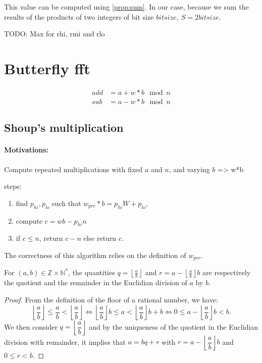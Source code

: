 \documentclass[a4paper]{article}
\begin{document}
This value can be computed using \ref{prop:sum}. In our case, because we sum the results of the products of two integers of bit size $bitsize,\ S = 2 bitsize$.

TODO: Max for rhi, rmi and rlo



\section{Butterfly fft}
\begin{align*}
    add &= a + w*b \mod n \\
    sub &= a - w*b \mod n 
\end{align*}

\subsection{Shoup's multiplication}


\paragraph{Motivations:} Compute repeated multiplications with fixed $a$ and $n$, and varying $b$ => w*b

steps:
\begin{enumerate}
    \item find $p_{hi}, p_{lo}$ such that $w_{pre} * b = p_{hi}W + p_{lo}$,
    \item compute $c = wb - p_{hi}n$
    \item if $c \leq n$, return $c-n$ else return $c$.
\end{enumerate}

The correctness of this algorithm relies on the definition of $w_{pre}$. 

\begin{proposition}\label{prop:quorem}
For $(a,b) \in \mathbb{Z}\times \mathbb{N}^*$, the quantities $q=\left\lfloor\frac{a}{b}\right\rfloor$ and $r=a - \left\lfloor\frac{a}{b}\right\rfloor b$ are respectively the quotient and the remainder in the Euclidian division of $a$ by $b$.
\end{proposition}
    
\begin{proof}
From the definition of the floor of a rational number, we have:
\[
    \left\lfloor\dfrac{a}{b}\right\rfloor \leq \dfrac{a}{b} < \left\lfloor\dfrac{a}{b}\right\rfloor \Longleftrightarrow
    \left\lfloor\dfrac{a}{b}\right\rfloor b \leq a < \left\lfloor\dfrac{a}{b}\right\rfloor b + b \Longleftrightarrow
    0 \leq a - \left\lfloor\dfrac{a}{b}\right\rfloor b < b.
\]
We then consider $q=\left\lfloor\dfrac{a}{b}\right\rfloor$ and by the uniqueness of the quotient in the Euclidian division with remainder, it implies that $a = bq + r$ with $r=a - \left\lfloor\dfrac{a}{b}\right\rfloor b$ and $0 \leq r < b$.
\end{proof}
\end{document}
